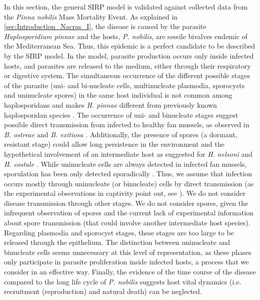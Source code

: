 In this section, the general SIRP model is validated against collected data
from the \textit{Pinna nobilis} Mass Mortality Event. As explained in
\cref{sec:Introduction_Nacras_I}, the disease is caused by the parasite
\textit{Haplosporidium pinnae} and the hosts, \textit{P. nobilis}, are sessile
bivalves endemic of the Mediterranean Sea. Thus, this epidemic is a perfect
candidate to be described by the SIRP model. In the model, parasite production
occurs only inside infected hosts, and parasites are released to the medium,
either through their respiratory or digestive system. The simultaneous
occurrence of the different possible stages of the parasite (uni- and
bi-nucleate cells, multinucleate plasmodia, sporocysts and uninucleate spores)
in the same host individual is not common among haplosporidans and makes
\textit{H. pinnae}  different from previously known haplosporidan species
\cite{CATANESE20189}. The occurrence of uni- and binucleate stages suggest
possible direct transmission from infected to healthy fan mussels, as observed
in \textit{B. ostreae} and \textit{B. exitiosa} \cite{hine1996ecology,
    Culloty2007, Audemard2014}. Additionally, the presence of spores (a
dormant,
resistant stage) could allow long persistence in the environment and the
hypothetical involvement of an intermediate host as suggested for \textit{H.
    nelsoni} and \textit{H. costale} \cite{Andrews1984,
    haskin1988uncertainties,
    powell1999modeling}. While uninucleate cells are always detected in
infected
fan mussels, sporulation has been only detected sporadically
\cite{CATANESE20189}. Thus, we assume that infection occurs mostly through
uninucleate (or binucleate) cells by direct transmission (as the experimental
observations in captivity point out, see \cite{March}).
We do not consider disease transmission through other stages. We do not
consider spores, given the infrequent observation of spores and the current
lack of experimental information about spore transmission (that could involve
another intermediate host species). Regarding plasmodia and sporocyst stages,
these stages are too large to be released through the epithelium. The
distinction between uninucleate and binucleate cells seems unnecessary at this
level of representation, as these phases only participate in parasite
proliferation inside infected hosts, a process that we consider in an effective
way. Finally, the evidence of the time course of the disease compared to the
long life cycle of {\it P. nobilis\/} suggests host vital dynamics (i.e.
recruitment (reproduction) and natural death) can be neglected.

